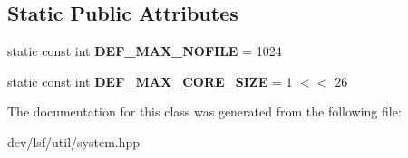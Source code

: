 \subsection*{Static Public Attributes}
\begin{DoxyCompactItemize}
\item 
\hypertarget{classlsf_1_1util_1_1System_a8923ac56abd7a1b653e9d8adaa8cb209}{
static const int {\bfseries DEF\_\-MAX\_\-NOFILE} = 1024}
\label{classlsf_1_1util_1_1System_a8923ac56abd7a1b653e9d8adaa8cb209}

\item 
\hypertarget{classlsf_1_1util_1_1System_a26ac9b7e8402c8d924efe04eacbec301}{
static const int {\bfseries DEF\_\-MAX\_\-CORE\_\-SIZE} = 1 $<$$<$ 26}
\label{classlsf_1_1util_1_1System_a26ac9b7e8402c8d924efe04eacbec301}

\end{DoxyCompactItemize}


The documentation for this class was generated from the following file:\begin{DoxyCompactItemize}
\item 
dev/lsf/util/system.hpp\end{DoxyCompactItemize}
